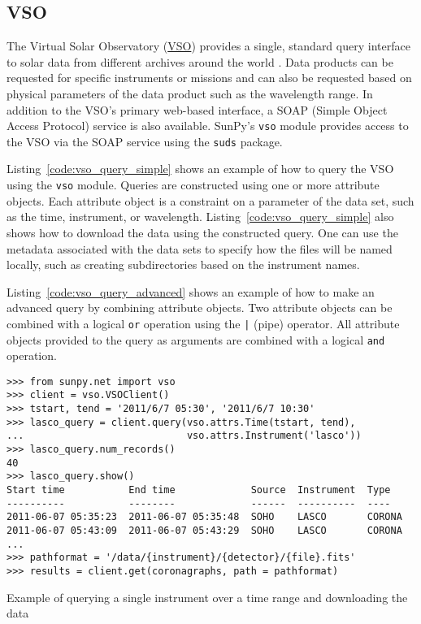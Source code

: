 \subsection{VSO}\label{ssec:vso}

The Virtual Solar Observatory (\href{http://virtualsolar.org}{VSO}) provides a 
single, standard query interface to solar data from different archives 
around the world \citep{hill2009}.
Data products can be requested for specific instruments or missions and
can also be requested based on physical parameters of the data product such
as the wavelength range.
In addition to the VSO's primary web-based interface, a SOAP (Simple Object 
Access Protocol) service is also available.
SunPy's \texttt{vso} module provides access to the VSO via the SOAP service using the
\texttt{suds} package.

Listing~\ref{code:vso_query_simple} shows an example of how to query the VSO
using the \texttt{vso} module.
Queries are constructed using one or more attribute objects. Each
attribute object is a constraint on a parameter of the data set, such as the
time, instrument, or wavelength.
Listing~\ref{code:vso_query_simple} also shows how to download the data using
the constructed query. One can use the metadata associated with the data sets to 
specify how the files will be named locally, such as creating subdirectories 
based on the instrument names.

Listing~\ref{code:vso_query_advanced} shows an example of how to make an advanced
query by combining attribute objects.
Two attribute objects can be combined with a logical \texttt{or} operation
using the \texttt{|} (pipe) operator.
All attribute objects provided to the query as arguments are combined with a 
logical \texttt{and} operation.

\begin{listing}[H]
\begin{verbatim}
>>> from sunpy.net import vso
>>> client = vso.VSOClient()
>>> tstart, tend = '2011/6/7 05:30', '2011/6/7 10:30'
>>> lasco_query = client.query(vso.attrs.Time(tstart, tend),
...                            vso.attrs.Instrument('lasco'))
>>> lasco_query.num_records()
40
>>> lasco_query.show() 
Start time           End time             Source  Instrument  Type
----------           --------             ------  ----------  ----
2011-06-07 05:35:23  2011-06-07 05:35:48  SOHO    LASCO       CORONA
2011-06-07 05:43:09  2011-06-07 05:43:29  SOHO    LASCO       CORONA
...
>>> pathformat = '/data/{instrument}/{detector}/{file}.fits'
>>> results = client.get(coronagraphs, path = pathformat)
\end{verbatim}
\caption{Example of querying a single instrument over a time range and downloading the data}
\label{code:vso_query_simple}
\end{listing}

